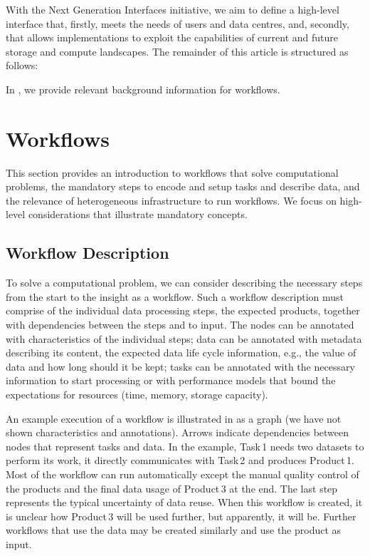\documentclass[a4paper, twocolumn]{article}
\begin{document}
\medskip

With the Next Generation Interfaces initiative, we aim to define a high-level interface that, firstly, meets the needs of users and data centres, and, secondly, that allows implementations to exploit the capabilities of current and future storage and compute landscapes.
The remainder of this article is structured as follows: \\

In , we provide relevant background information for workflows.


\section{Workflows}
\label{sec:background}
This section provides an introduction to workflows that solve computational problems, the mandatory steps to encode and setup tasks and describe data, and the relevance of heterogeneous infrastructure to run workflows.
We focus on high-level considerations that illustrate mandatory concepts.


\subsection{Workflow Description}

To solve a computational problem, we can consider describing the necessary steps from the start to the insight as a workflow.
Such a workflow description must comprise of the individual data processing steps, the expected products, together with dependencies between the steps and to input.
The nodes can be annotated with characteristics of the individual steps;
data can be annotated with metadata describing its content, the expected data life cycle information, e.g., the value of data and how long should it be kept; tasks can be annotated with the necessary information to start processing or with performance models that bound the expectations for resources (time, memory, storage capacity).

An example execution of a workflow is illustrated in  as a graph (we have not shown characteristics and annotations).
Arrows indicate dependencies between nodes that represent tasks and data.
In the example, Task\,1 needs two datasets to perform its work, it directly communicates with Task\,2 and produces Product\,1.
Most of the workflow can run automatically except the manual quality control of the products and the final data usage of Product\,3 at the end.
The last step represents the typical uncertainty of data reuse. When this workflow is created, it is unclear how Product\,3 will be used further, but apparently, it will be.
Further workflows that use the data may be created similarly and use the product as input.
\end{document}
